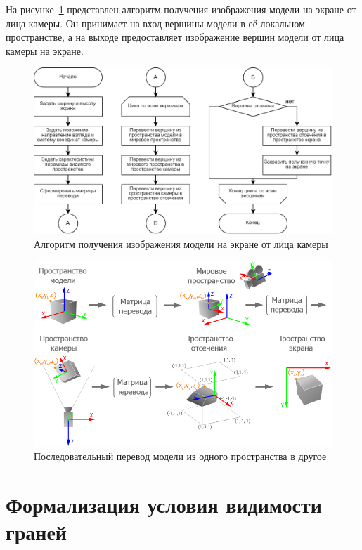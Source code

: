 На рисунке~\ref{fig:camera-image} представлен алгоритм получения изображения модели на экране от лица камеры. Он принимает на вход вершины модели в её локальном пространстве, а на выходе предоставляет изображение вершин модели от лица камеры на экране.
\begin{figure}[h] 
	\centering
	\includegraphics[width=1\textwidth]{images/camera-image.png}
	\caption{Алгоритм получения изображения модели на экране от лица камеры} 
	\label{fig:camera-image} 
\end{figure}
\begin{figure}[h] 
	\centering
	\includegraphics[width=1\textwidth]{images/space_transformations.png}
	\caption{Последовательный перевод модели из одного пространства в другое} 
	\label{fig:space-transformations} 
\end{figure}

\clearpage

\section{Формализация условия видимости граней}

